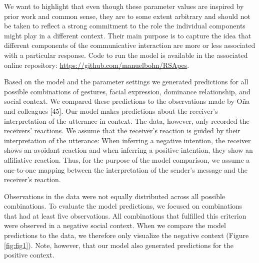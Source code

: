 \documentclass[
  english,
  man,floatsintext]{apa6}
\begin{document}
We want to highlight that even though these parameter values are inspired by prior work and common sense, they are to some extent arbitrary and should not be taken to reflect a strong commitment to the role the individual components might play in a different context. Their main purpose is to capture the idea that different components of the communicative interaction are more or less associated with a particular response. Code to run the model is available in the associated online repository: \url{https://github.com/manuelbohn/RSApes}.

Based on the model and the parameter settings we generated predictions for all possible combinations of gestures, facial expression, dominance relationship, and social context. We compared these predictions to the observations made by Oña and colleagues {[}45{]}. Our model makes predictions about the receiver's interpretation of the utterance in context. The data, however, only recorded the receivers' reactions. We assume that the receiver's reaction is guided by their interpretation of the utterance: When inferring a negative intention, the receiver shows an avoidant reaction and when inferring a positive intention, they show an affiliative reaction. Thus, for the purpose of the model comparison, we assume a one-to-one mapping between the interpretation of the sender's message and the receiver's reaction.

Observations in the data were not equally distributed across all possible combinations. To evaluate the model predictions, we focused on combinations that had at least five observations. All combinations that fulfilled this criterion were observed in a negative social context. When we compare the model predictions to the data, we therefore only visualize the negative context (Figure \ref{fig:fig1}). Note, however, that our model also generated predictions for the positive context.
\end{document}
